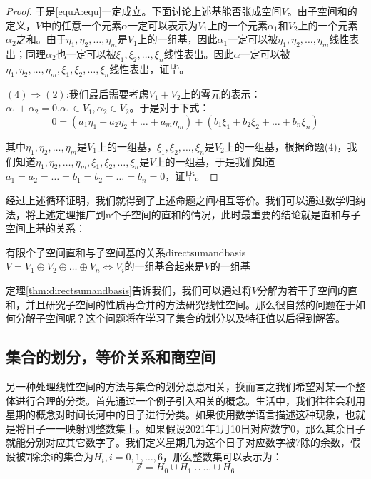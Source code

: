 \begin{proof}
    于是\ref{equA:equ}一定成立。下面讨论上述基能否张成空间$V$。由子空间和的定义，$V$中的任意一个元素$\alpha$一定可以表示为$V_1$上的一个元素$\alpha_1$和$V_2$上的一个元素$\alpha_2$之和。由于$\eta_1,\eta_2,\dots,\eta_m$是$V_1$上的一组基，因此$\alpha_1$一定可以被$\eta_1,\eta_2,\dots,\eta_m$线性表出；同理$\alpha_2$也一定可以被$\xi_1,\xi_2,\dots,\xi_n$线性表出。因此$\alpha$一定可以被$\eta_1,\eta_2,\dots,\eta_m,\xi_1,\xi_2,\dots,\xi_n$线性表出，证毕。
    
    $(4)\Rightarrow(2)$:我们最后需要考虑$V_1+V_2$上的零元的表示：$\alpha_1+\alpha_2=0.\alpha_1\in V_1,\alpha_2\in V_2$。于是对于下式：
    \begin{equation}
        0= (a_1\eta_1+a_2\eta_2+\dots+a_m\eta_m)+(b_1\xi_1+b_2\xi_2+\dots+b_n\xi_n)
    \end{equation}
    
    其中$\eta_1,\eta_2,\dots,\eta_m$是$V_1$上的一组基，$\xi_1,\xi_2,\dots,\xi_n$是$V_2$上的一组基，根据命题(4)，我们知道$\eta_1,\eta_2,\dots,\eta_m,\xi_1,\xi_2,\dots,\xi_n$是$V$上的一组基，于是我们知道$a_1=a_2=\dots=b_1=b_2=\dots=b_n=0$，证毕。
    \end{proof}
    
    经过上述循环证明，我们就得到了上述命题之间相互等价。我们可以通过数学归纳法，将上述定理推广到n个子空间的直和的情况，此时最重要的结论就是直和与子空间上基的关系：
    \begin{theorem}{有限个子空间直和与子空间基的关系}{directsumandbasis}
        $V=V_1\oplus V_2 \oplus \dots \oplus V_n\Longleftrightarrow V_i$的一组基合起来是$V$的一组基
    \end{theorem}
    
    定理\ref{thm:directsumandbasis}告诉我们，我们可以通过将$V$分解为若干子空间的直和，并且研究子空间的性质再合并的方法研究线性空间。那么很自然的问题在于如何分解子空间呢？这个问题将在学习了集合的划分以及特征值以后得到解答。
    \subsection{集合的划分，等价关系和商空间}
   另一种处理线性空间的方法与集合的划分息息相关，换而言之我们希望对某一个整体进行合理的分类。首先通过一个例子引入相关的概念。生活中，我们往往会利用星期的概念对时间长河中的日子进行分类。如果使用数学语言描述这种现象，也就是将日子一一映射到整数集上。如果假设2021年1月10日对应数字0，那么其余日子就能分别对应其它数字了。我们定义星期几为这个日子对应数字被7除的余数，假设被7除余i的集合为$H_i,i=0,1,\dots,6$，那么整数集可以表示为：
   \begin{equation}
       \mathbb{Z}=H_0\cup H_1\cup \dots \cup H_6
   \end{equation}
   
